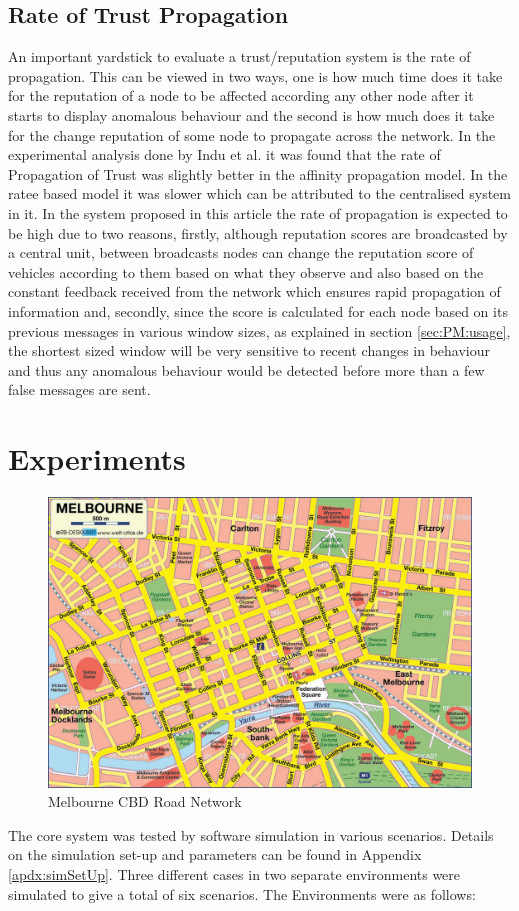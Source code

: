 \documentclass[journal]{IEEEtran}
\begin{document}
\subsection{Rate of Trust Propagation}
An important yardstick to evaluate a trust/reputation system is the rate of propagation. This can be viewed in two ways, one is how much time does it take for the reputation of a node to be affected according any other node after it starts to display anomalous behaviour and the second is how much does it take for the change reputation of some node to propagate across the network. 
In the experimental analysis done by Indu et al.\cite{c:compareTrust} it was found that the rate of Propagation of Trust was slightly better in the affinity propagation model. In the ratee based model it was slower which can be attributed to the centralised system in it. In the system proposed in this article the rate of propagation is expected to be high due to two reasons, firstly, although reputation scores are broadcasted by a central unit, between broadcasts nodes can change the reputation score of vehicles according to them based on what they observe and also based on the constant feedback received from the network which ensures rapid propagation of information and, secondly, since the score is calculated for each node based on its previous messages in various window sizes, as explained in section \ref{sec:PM:usage}, the shortest sized window will be very sensitive to recent changes in behaviour and thus any anomalous behaviour would be detected before more than a few false messages are sent.
\section{Experiments}
\begin{figure}[!t]	
	\includegraphics[width=\linewidth,keepaspectratio]{images/cbdmap.jpg}
	\caption{Melbourne CBD Road Network}
	\label{fig:CBDRoads}
\end{figure}
\label{sec:Experiments}
The core system was tested by software simulation in various scenarios. Details on the simulation set-up and parameters can be found in Appendix \ref{apdx:simSetUp}. Three different cases in two separate environments were simulated to give a total of six scenarios. The Environments were as follows:
\end{document}
